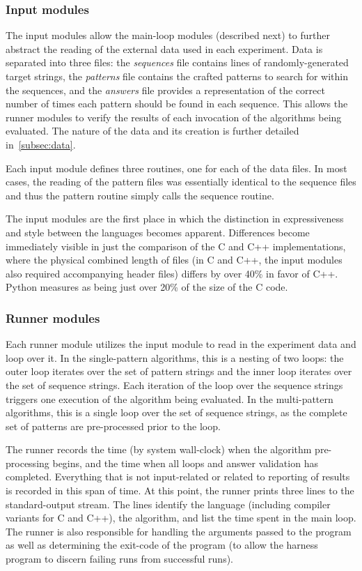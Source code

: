 \subsubsection{Input modules}

The input modules allow the main-loop modules (described next) to further abstract the reading of the external data used in each experiment. Data is separated into three files: the \textit{sequences} file contains lines of randomly-generated target strings, the \textit{patterns} file contains the crafted patterns to search for within the sequences, and the \textit{answers} file provides a representation of the correct number of times each pattern should be found in each sequence. This allows the runner modules to verify the results of each invocation of the algorithms being evaluated. The nature of the data and its creation is further detailed in~\ref{subsec:data}.

Each input module defines three routines, one for each of the data files. In most cases, the reading of the pattern files was essentially identical to the sequence files and thus the pattern routine simply calls the sequence routine.

The input modules are the first place in which the distinction in expressiveness and style between the languages becomes apparent. Differences become immediately visible in just the comparison of the C and C++ implementations, where the physical combined length of files (in C and C++, the input modules also required accompanying header files) differs by over 40\% in favor of C++. Python measures as being just over 20\% of the size of the C code.

\subsubsection{Runner modules}

Each runner module utilizes the input module to read in the experiment data and loop over it. In the single-pattern algorithms, this is a nesting of two loops: the outer loop iterates over the set of pattern strings and the inner loop iterates over the set of sequence strings. Each iteration of the loop over the sequence strings triggers one execution of the algorithm being evaluated. In the multi-pattern algorithms, this is a single loop over the set of sequence strings, as the complete set of patterns are pre-processed prior to the loop.

The runner records the time (by system wall-clock) when the algorithm pre-processing begins, and the time when all loops and answer validation has completed. Everything that is not input-related or related to reporting of results is recorded in this span of time. At this point, the runner prints three lines to the standard-output stream. The lines identify the language (including compiler variants for C and C++), the algorithm, and list the time spent in the main loop. The runner is also responsible for handling the arguments passed to the program as well as determining the exit-code of the program (to allow the harness program to discern failing runs from successful runs).

